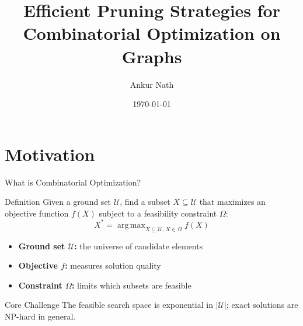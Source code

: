 \documentclass[aspectratio=169,xcolor=dvipsnames,8pt]{beamer}
\title[Efficient Pruning for Graph CO]{Efficient Pruning Strategies for\\Combinatorial Optimization on Graphs}
\author[A. Nath]{Ankur Nath}
\institute[TAMU]{%
  Department of Computer Science\\
  Texas A\&M University\\
  \vspace{0.3cm}
  {\small Committee: Dr.\ Alan Kuhnle (Chair), Dr.\ Yoonsuck Choe,
  Dr.\ James Caverlee, Dr.\ Abhishek Chakrabortty}
}
\date{\today}
\DeclareMathOperator*{\argmax}{arg\,max}
\begin{document}
\begin{frame}[plain]
  \titlepage
\end{frame}

\section{Motivation}

\begin{frame}{What is Combinatorial Optimization?}
  \begin{block}{Definition}
    Given a ground set $\mathcal{U}$, find a subset $X \subseteq \mathcal{U}$ that maximizes an objective function $f(X)$ subject to a feasibility constraint $\Omega$:
    \[
      X^* = \argmax_{X \subseteq \mathcal{U},\, X \in \Omega} f(X)
    \]
  \end{block}

  \vspace{0.2cm}

  \begin{itemize}
    \item \textbf{Ground set $\mathcal{U}$:} the universe of candidate elements 
    \item \textbf{Objective $f$:} measures solution quality 
    \item \textbf{Constraint $\Omega$:} limits which subsets are feasible 
  \end{itemize}

  \vspace{0.2cm}

  \begin{alertblock}{Core Challenge}
    The feasible search space is exponential in $|\mathcal{U}|$; exact solutions are NP-hard in general.
  \end{alertblock}
\end{frame}
\end{document}
